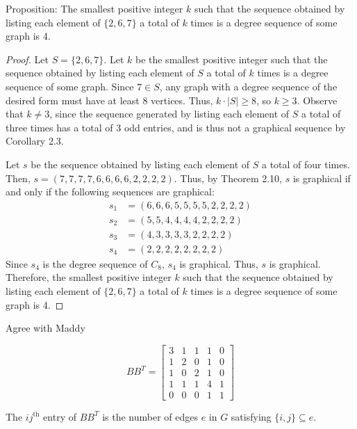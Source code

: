 \documentclass[12pt]{article}
\begin{document}
\bigskip{} Proposition: The smallest positive integer $k$ such that the sequence obtained by listing each element of $\{2,6,7\}$ a total of $k$ times is a degree sequence of some graph is 4.
\begin{proof}
    Let $S = \{2,6,7\}$.
    Let $k$ be the smallest positive integer such that the sequence obtained by listing each element of $S$ a total of $k$ times is a degree sequence of some graph.
    Since $7 \in S$, any graph with a degree sequence of the desired form must have at least 8 vertices.
    Thus, $k \cdot |S| \geq 8$, so $k \geq 3$.
    Observe that $k \neq 3$, since the sequence generated by listing each element of $S$ a total of three times has a total of 3 odd entries, and is thus not a graphical sequence by Corollary 2.3.

    Let $s$ be the sequence obtained by listing each element of $S$ a total of four times.
    Then, $s = (7,7,7,7,6,6,6,6,2,2,2,2)$.
    Thus, by Theorem 2.10, $s$ is graphical if and only if the following sequences are graphical:
    \begin{align*}
        s_1 &= (6,6,6,5,5,5,5,2,2,2,2) \\
        s_2 &=   (5,5,4,4,4,4,2,2,2,2) \\
        s_3 &=     (4,3,3,3,3,2,2,2,2) \\
        s_4 &=       (2,2,2,2,2,2,2,2)
    \end{align*}
    Since $s_4$ is the degree sequence of $C_8$, $s_4$ is graphical.
    Thus, $s$ is graphical.
    Therefore, the smallest positive integer $k$ such that the sequence obtained by listing each element of $\{2,6,7\}$ a total of $k$ times is a degree sequence of some graph is 4.
\end{proof}

\bigskip{}

    

\bigskip{}



\bigskip{} 
Agree with Maddy

\bigskip{}

$$BB^T = \begin{bmatrix}
3&1&1&1&0\\
1&2&0&1&0\\
1&0&2&1&0\\
1&1&1&4&1\\
0&0&0&1&1
\end{bmatrix}$$

 The $ij^{\text{th}}$ entry of $BB^T$ is the number of edges $e$ in $G$ satisfying $\{i,j\} \subseteq e$.

    
\end{document}
